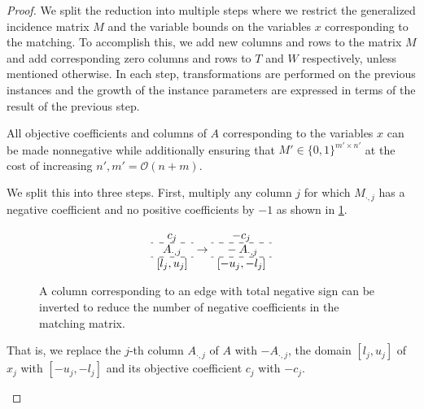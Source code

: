 \documentclass[a4paper,UKenglish,cleveref,thm-restate]{lipics-v2021}
\makeatletter
\renewcommand{\O}{\mathcal O}
\newenvironment{cdisplaymath}{\@fleqnfalse\begin{displaymath}}{\end{displaymath}}
\makeatother
\begin{document}
\begin{proof}
    We split the reduction into multiple steps where we restrict the generalized incidence matrix $M$ and the variable bounds on the variables $x$ corresponding to the matching. To accomplish this, we add new columns and rows to the matrix $M$ and add corresponding zero columns and rows to $T$ and $W$ respectively, unless mentioned otherwise. In each step, transformations are performed on the previous instances and the growth of the instance parameters are expressed in terms of the result of the previous step.
    \begin{claim*}
        All objective coefficients and columns of $A$ corresponding to the variables $x$ can be made nonnegative while additionally ensuring that $M'\in\{0,1\}^{m'\times n'}$ at the cost of increasing $n',m'=\O(n+m)$.
        \label{claim:nonnegativity}
    \end{claim*}
    \begin{claimproof}
        We split this into three steps.
        First, multiply any column $j$ for which $M_{\cdot,j}$ has a negative coefficient and no positive coefficients by $-1$ as shown in \cref{fig:invert-column}.
        \begin{figure}[H]
            \begin{cdisplaymath}
                \begin{array}{c}
                    c_j\\
                    \hdashline{}
                    A_{\cdot,j}\\
                    \hdashline{}
                    [l_j,u_j]
                \end{array}
                \to
                \begin{array}{c}
                    -c_j\\
                    \hdashline{}
                    -A_{\cdot,j}\\
                    \hdashline{}
                    [-u_j,-l_j]
                \end{array}
            \end{cdisplaymath}
            \caption{A column corresponding to an edge with total negative sign can be inverted to reduce the number of negative coefficients in the matching matrix.}
            \label{fig:invert-column}
        \end{figure}
        That is, we replace the $j$-th column $A_{\cdot,j}$ of $A$ with $-A_{\cdot,j}$, the domain $[l_j,u_j]$ of $x_j$ with $[-u_j,-l_j]$ and its objective coefficient $c_j$ with $-c_j$.
        

\end{claimproof}
\end{proof}
\end{document}
